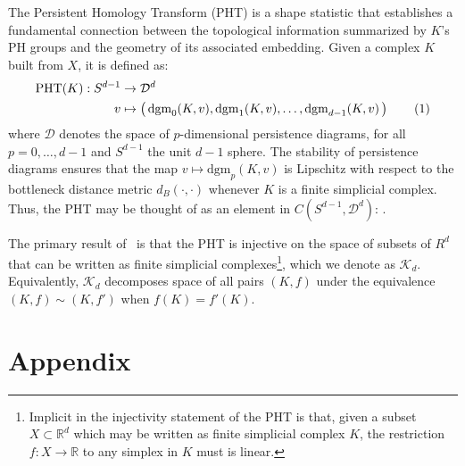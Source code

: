 \documentclass[10pt]{article}
\numberwithin{equation}{section}
\newcommand{\+}{%
	\raisebox{0.18ex}{\scaleobj{0.55}{+}}
}
\theoremstyle{definition}
\newcommand\numberthis{\addtocounter{equation}{1}\tag{\theequation}}
\begin{document}
The Persistent Homology Transform (PHT) is a shape statistic that establishes a fundamental connection between the topological information summarized by $K$'s PH groups and the geometry of its associated embedding. Given a complex $K$ built from $X$, it is defined as: 
\begin{align*}\label{eq:pht}
	\mathrm{PHT}(K): S^{d-1} &\to \mathcal{D}^d \\
	v &\mapsto \left( \, \mathrm{dgm}_0(K, v), \mathrm{dgm}_1(K, v), \dots, \mathrm{dgm}_{d-1}(K, v) \, \right)\numberthis
\end{align*}
where $\mathcal{D}$ denotes the space of $p$-dimensional persistence diagrams, for all $p = 0, \dots, d-1$ and $S^{d-1}$ the unit $d-1$ sphere. The stability of persistence diagrams ensures that the map $v \mapsto \mathrm{dgm}_p(K, v)$ is Lipschitz with respect to the bottleneck distance metric $d_B(\cdot, \cdot)$ whenever $K$ is a finite simplicial complex. 
Thus, the PHT may be thought of as an element in $C(S^{d-1}, \mathcal{D}^d)$: . 


The primary result of~\cite{} is that the PHT is injective on the space of subsets of $R^d$ that can be written as finite simplicial complexes\footnote{Implicit in the injectivity statement of the PHT is that, given a subset $X \subset \mathbb{R}^d$ which may be written as finite simplicial complex $K$, the restriction $f: X \to \mathbb{R}$ to any simplex in $K$ must is linear.}, which we denote as $\mathcal{K}_d$. 
Equivalently, $\mathcal{K}_d$ decomposes space of all pairs $(K, f)$ under the equivalence $(K, f) \sim (K,f')$ when $f(K) = f'(K)$.

 

\appendix
\section{Appendix}
\end{document}
